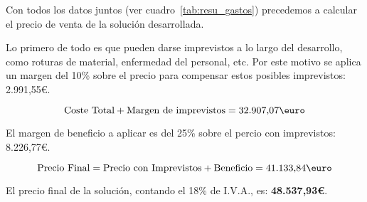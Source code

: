 Con todos los datos juntos (ver cuadro~\ref{tab:resu_gastos}) precedemos a calcular el precio de venta de la solución desarrollada.

Lo primero de todo es que pueden darse imprevistos a lo largo del desarrollo, como roturas de material, enfermedad del personal, etc. Por este motivo se aplica un margen del 10\% sobre el precio para compensar estos posibles imprevistos: 2.991,55\euro.

$$
\mbox{Coste Total} + \mbox{Margen de imprevistos} = \mbox{32.907,07\euro}
$$

El margen de beneficio a aplicar es del 25\% sobre el percio con imprevistos: 8.226,77\euro.

$$
	\mbox{Precio Final} = \mbox{Precio con Imprevistos} + \mbox{Beneficio} = \mbox{41.133,84\euro}
$$

El precio final de la solución, contando el 18\% de I.V.A., es: {\large \textbf{48.537,93\euro}}.






